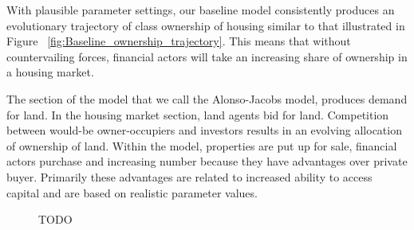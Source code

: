 

With plausible parameter settings, our baseline model consistently produces an evolutionary trajectory of class ownership of housing similar to that illustrated in Figure ~\ref{fig:Baseline_ownership_trajectory}. 
This means that without countervailing forces, financial actors will take an increasing share of ownership in a housing market. 

The section of the model that we call the \gls{Alonso-Jacobs model}, produces demand for land. In the housing market section, land agents bid for land. Competition between would-be owner-occupiers and investors results in an evolving allocation of ownership of land. Within the model, properties are put up for sale, financial actors purchase and increasing number because they have advantages over private buyer. Primarily these advantages are related to increased ability to access capital and are based on realistic parameter values. 
\begin{figure}
\centering
{}
\caption{TODO}
\label{fig:enter-label}
\end{figure}

